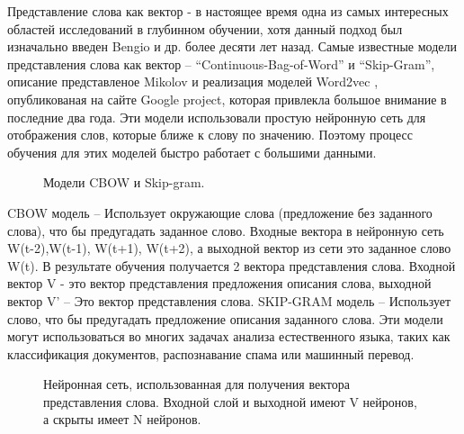 \documentclass[12pt]{article}
\begin{document}
Представление слова как вектор - в настоящее время одна из самых интересных областей исследований в глубинном обучении, хотя данный подход был изначально введен Bengio \cite{Bengio} и др. более десяти лет назад. Самые известные модели представления слова как вектор – “Continuous-Bag-of-Word” и “Skip-Gram”, описание представленое Mikolov\cite{Mikolov} и реализация моделей Word2vec \cite{word2vec}, опубликованая на сайте Google project, которая привлекла большое внимание в последние два года. Эти модели использовали простую нейронную сеть для отображения слов, которые ближе к слову по значению. Поэтому процесс обучения для этих моделей быстро работает с большими данными. 
	
	\begin{figure}[H]
		\noindent{}
		\caption{Модели CBOW и Skip-gram.}
		\label{figCurves}
	\end{figure}
	
CBOW модель – Использует окружающие слова (предложение без заданного слова), что бы предугадать заданное слово. Входные вектора в нейронную сеть W(t-2),W(t-1), W(t+1), W(t+2), а выходной вектор из сети это заданное слово W(t). В результате обучения получается 2 вектора представления слова. Входной вектор V - это вектор представления предложения описания слова, выходной вектор V’ – Это вектор представления слова. SKIP-GRAM модель – Использует слово, что бы предугадать предложение описания заданного слова. Эти модели могут использоваться во многих задачах анализа естественного языка, таких как классификация документов, распознавание спама или машинный перевод.

 	\begin{figure}[H]
		\noindent{}
		\caption{Нейронная сеть, использованная для получения вектора представления слова. Входной слой и выходной имеют V нейронов, а скрыты имеет N нейронов.}
		\label{figCurves}
	\end{figure}
\end{document}
